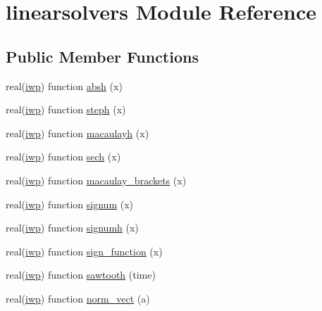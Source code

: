 \hypertarget{classlinearsolvers}{}\section{linearsolvers Module Reference}
\label{classlinearsolvers}
\subsection*{Public Member Functions}
\begin{DoxyCompactItemize}
\item 
real(\hyperlink{classlinearsolvers_ae428ee060e10bb0c2b1ce969c90536e1}{iwp}) function \hyperlink{classlinearsolvers_a50fc159b27f300532e6f3803cdf04461}{absh} (x)
\item 
real(\hyperlink{classlinearsolvers_ae428ee060e10bb0c2b1ce969c90536e1}{iwp}) function \hyperlink{classlinearsolvers_aeeedc4336701e962d4bb193d99fe6b34}{steph} (x)
\item 
real(\hyperlink{classlinearsolvers_ae428ee060e10bb0c2b1ce969c90536e1}{iwp}) function \hyperlink{classlinearsolvers_a16b20c4dbbb4118e45be428b09d07162}{macaulayh} (x)
\item 
real(\hyperlink{classlinearsolvers_ae428ee060e10bb0c2b1ce969c90536e1}{iwp}) function \hyperlink{classlinearsolvers_a46e91c03e5113ececb9ed22e185356d3}{sech} (x)
\item 
real(\hyperlink{classlinearsolvers_ae428ee060e10bb0c2b1ce969c90536e1}{iwp}) function \hyperlink{classlinearsolvers_a4f2604cddb51fdacfaf336c090a26a6a}{macaulay\+\_\+brackets} (x)
\item 
real(\hyperlink{classlinearsolvers_ae428ee060e10bb0c2b1ce969c90536e1}{iwp}) function \hyperlink{classlinearsolvers_a0cd14b9f4b5f800d655d05fbe562c7f3}{signum} (x)
\item 
real(\hyperlink{classlinearsolvers_ae428ee060e10bb0c2b1ce969c90536e1}{iwp}) function \hyperlink{classlinearsolvers_a0316a863acd8567fa69b11e05fe7a8b7}{signumh} (x)
\item 
real(\hyperlink{classlinearsolvers_ae428ee060e10bb0c2b1ce969c90536e1}{iwp}) function \hyperlink{classlinearsolvers_a1bba38e01a23051a3014553c8dc9be6d}{sign\+\_\+function} (x)
\item 
real(\hyperlink{classlinearsolvers_ae428ee060e10bb0c2b1ce969c90536e1}{iwp}) function \hyperlink{classlinearsolvers_ae3a8ec964c1a023cc2f166c7c0730d47}{sawtooth} (time)
\item 
real(\hyperlink{classlinearsolvers_ae428ee060e10bb0c2b1ce969c90536e1}{iwp}) function \hyperlink{classlinearsolvers_a752da896b4e03c952e9f3a5ab66b909c}{norm\+\_\+vect} (a)

\end{DoxyCompactItemize}
